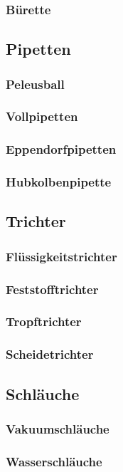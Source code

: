 \subsubsection{Bürette}

\subsection{Pipetten}
\subsubsection{Peleusball}
\subsubsection{Vollpipetten}
\subsubsection{Eppendorfpipetten}
\subsubsection{Hubkolbenpipette}

\subsection{Trichter}
\subsubsection{Flüssigkeitstrichter}
\subsubsection{Feststofftrichter}
\subsubsection{Tropftrichter}
\subsubsection{Scheidetrichter}

\subsection{Schläuche}
\subsubsection{Vakuumschläuche}
\subsubsection{Wasserschläuche}
